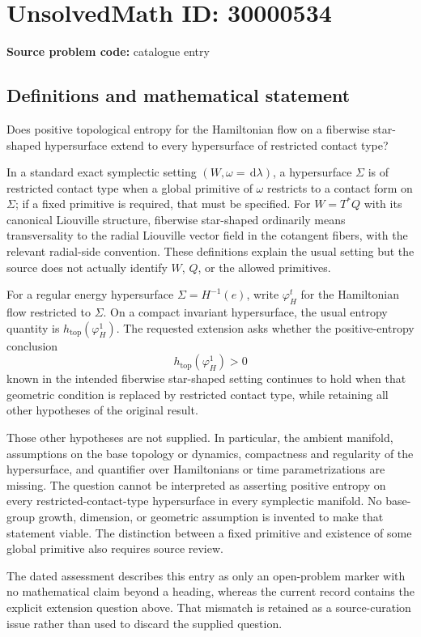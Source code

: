 \documentclass[11pt]{article}
\newcommand{\dd}{\,\mathrm{d}}
\begin{document}
\section*{UnsolvedMath ID: 30000534}
\textbf{Source problem code:} catalogue entry
\subsection{Definitions and mathematical statement}
Does positive topological entropy for the Hamiltonian flow on a fiberwise star-shaped hypersurface extend to every hypersurface of restricted contact type?

In a standard exact symplectic setting $(W,\omega=\dd\lambda)$, a hypersurface $\Sigma$ is of restricted contact type when a global primitive of $\omega$ restricts to a contact form on $\Sigma$; if a fixed primitive is required, that must be specified. For $W=T^*Q$ with its canonical Liouville structure, fiberwise star-shaped ordinarily means transversality to the radial Liouville vector field in the cotangent fibers, with the relevant radial-side convention. These definitions explain the usual setting but the source does not actually identify $W$, $Q$, or the allowed primitives.

For a regular energy hypersurface $\Sigma=H^{-1}(e)$, write $\varphi_H^t$ for the Hamiltonian flow restricted to $\Sigma$. On a compact invariant hypersurface, the usual entropy quantity is $h_{\mathrm{top}}(\varphi_H^1)$. The requested extension asks whether the positive-entropy conclusion
\[
 h_{\mathrm{top}}(\varphi_H^1)>0
\]
known in the intended fiberwise star-shaped setting continues to hold when that geometric condition is replaced by restricted contact type, while retaining all other hypotheses of the original result.

Those other hypotheses are not supplied. In particular, the ambient manifold, assumptions on the base topology or dynamics, compactness and regularity of the hypersurface, and quantifier over Hamiltonians or time parametrizations are missing. The question cannot be interpreted as asserting positive entropy on every restricted-contact-type hypersurface in every symplectic manifold. No base-group growth, dimension, or geometric assumption is invented to make that statement viable. The distinction between a fixed primitive and existence of some global primitive also requires source review.

The dated assessment describes this entry as only an open-problem marker with no mathematical claim beyond a heading, whereas the current record contains the explicit extension question above. That mismatch is retained as a source-curation issue rather than used to discard the supplied question.
\end{document}
